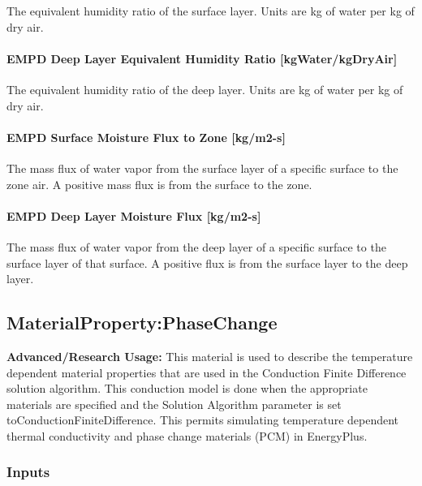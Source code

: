The equivalent humidity ratio of the surface layer. Units are kg of water per kg of dry air.

\paragraph{EMPD Deep Layer Equivalent Humidity Ratio {[}kgWater/kgDryAir{]}}\label{empd-deep-layer-equivalent-humidity-ratio-kgwaterkgdryair}

The equivalent humidity ratio of the deep layer. Units are kg of water per kg of dry air.

\paragraph{EMPD Surface Moisture Flux to Zone {[}kg/m2-s{]}}\label{empd-surface-moisture-flux-to-zone-kgm2-s}

The mass flux of water vapor from the surface layer of a specific surface to the zone air. A positive mass flux is from the surface to the zone.

\paragraph{EMPD Deep Layer Moisture Flux {[}kg/m2-s{]}}\label{empd-deep-layer-moisture-flux-kgm2-s}

The mass flux of water vapor from the deep layer of a specific surface to the surface layer of that surface. A positive flux is from the surface layer to the deep layer.

\subsection{MaterialProperty:PhaseChange}\label{materialpropertyphasechange}

\textbf{Advanced/Research Usage:} This material is used to describe the temperature dependent material properties that are used in the Conduction Finite Difference solution algorithm. This conduction model is done when the appropriate materials are specified and the Solution Algorithm parameter is set toConductionFiniteDifference. This permits simulating temperature dependent thermal conductivity and phase change materials (PCM) in EnergyPlus.

\subsubsection{Inputs}\label{inputs-5-030}

